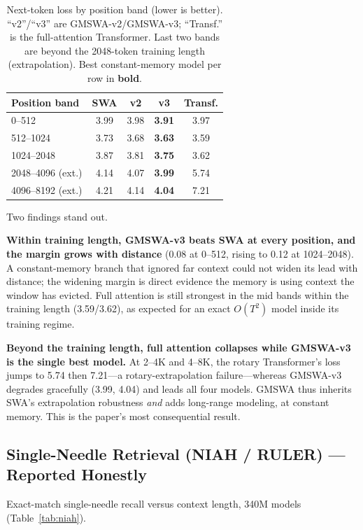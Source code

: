 \documentclass[letterpaper]{article} %
\begin{document}
\begin{table}[t]
\centering
\caption{Next-token loss by position band (lower is better). ``v2''/``v3'' are GMSWA-v2/GMSWA-v3; ``Transf.'' is the full-attention Transformer. Last two bands are beyond the 2048-token training length (extrapolation). Best constant-memory model per row in \textbf{bold}.}
\label{tab:loss}
\small
\setlength{\tabcolsep}{4pt}
\begin{tabular}{lcccc}
\toprule
Position band & SWA & v2 & v3 & Transf. \\
\midrule
0--512            & 3.99 & 3.98 & \textbf{3.91} & 3.97 \\
512--1024         & 3.73 & 3.68 & \textbf{3.63} & 3.59 \\
1024--2048        & 3.87 & 3.81 & \textbf{3.75} & 3.62 \\
2048--4096 (ext.) & 4.14 & 4.07 & \textbf{3.99} & 5.74 \\
4096--8192 (ext.) & 4.21 & 4.14 & \textbf{4.04} & 7.21 \\
\bottomrule
\end{tabular}
\end{table}

Two findings stand out.

\textbf{Within training length, GMSWA-v3 beats SWA at every position, and the margin grows with distance} (0.08 at 0--512, rising to 0.12 at 1024--2048). A constant-memory branch that ignored far context could not widen its lead with distance; the widening margin is direct evidence the memory is using context the window has evicted. Full attention is still strongest in the mid bands within the training length (3.59/3.62), as expected for an exact $O(T^2)$ model inside its training regime.

\textbf{Beyond the training length, full attention collapses while GMSWA-v3 is the single best model.} At 2--4K and 4--8K, the rotary Transformer's loss jumps to 5.74 then 7.21---a rotary-extrapolation failure---whereas GMSWA-v3 degrades gracefully (3.99, 4.04) and leads all four models. GMSWA thus inherits SWA's extrapolation robustness \emph{and} adds long-range modeling, at constant memory. This is the paper's most consequential result.

\subsection{Single-Needle Retrieval (NIAH / RULER) --- Reported Honestly}
Exact-match single-needle recall versus context length, 340M models (Table~\ref{tab:niah}).
\end{document}
